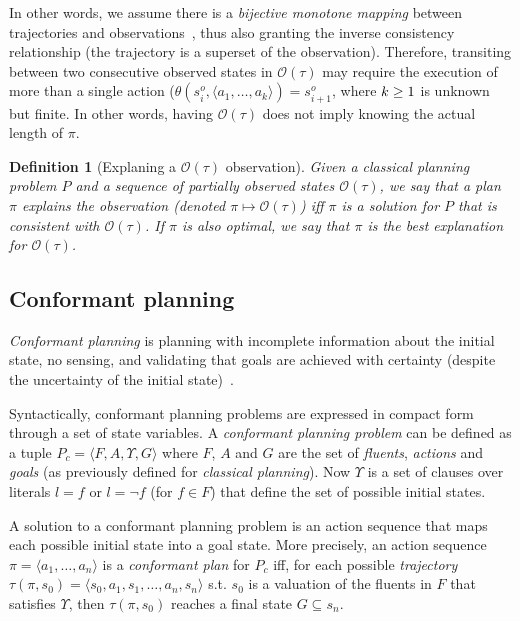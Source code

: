 \documentclass{article}
\newcommand{\tup}[1]{{\langle #1 \rangle}}
\newtheorem{definition}[theorem]{Definition}
\begin{document}
In other words, we assume there is a {\em bijective monotone mapping} between trajectories and observations~\cite{ramirez2009plan}, thus also granting the inverse consistency relationship (the trajectory is a superset of the observation). Therefore, transiting between two consecutive observed states in $\mathcal{O}(\tau)$ may require the execution of more than a single action ($\theta(s_i^o,\tup{a_1,\ldots,a_k})=s_{i+1}^o$, where ${\small k\geq 1}$ is unknown but finite. In other words, having $\mathcal{O}(\tau)$ does not imply knowing the actual length of $\pi$.

\begin{definition}[Explaning a $\mathcal{O}(\tau)$ observation]
Given a {\em classical planning problem} $P$ and a sequence of partially observed states $\mathcal{O}(\tau)$, we say that a plan $\pi$ {\em explains the observation} (denoted $\pi\mapsto\mathcal{O}(\tau)$) iff $\pi$ is a solution for $P$ that is consistent with $\mathcal{O}(\tau)$. If $\pi$ is also optimal, we say that $\pi$ is the {\em best explanation} for $\mathcal{O}(\tau)$. 
\end{definition}

\subsection{Conformant planning}
{\em Conformant planning} is planning with incomplete information about the initial state, no sensing, and validating that goals are achieved with certainty (despite the uncertainty of the initial state)~\cite{goldman1996expressive,smith1998conformant,bonet2000planning}.

Syntactically, conformant planning problems are expressed in compact form through a set of state variables. A {\em conformant planning problem} can be defined as a tuple $P_c=\tup{F,A,\Upsilon,G}$ where $F$, $A$ and $G$ are the set of {\em fluents}, {\em actions} and {\em goals} (as previously defined for {\em classical planning}). Now $\Upsilon$ is a set of clauses over literals $l=f$ or $l=\neg f$ (for $f\in F$) that define the set of possible initial states. 

A solution to a conformant planning problem is an action sequence that maps each possible initial state into a goal state. More precisely, an action sequence $\pi=\tup{a_1, \ldots, a_n}$ is a {\em conformant plan} for $P_c$ iff, for each possible {\em trajectory} $\tau(\pi,s_0)=\tup{s_0, a_1, s_1, \ldots, a_n, s_n}$ s.t. $s_0$ is a valuation of the fluents in $F$ that satisfies $\Upsilon$, then $\tau(\pi,s_0)$ reaches a final state $G \subseteq s_n$.
\end{document}
